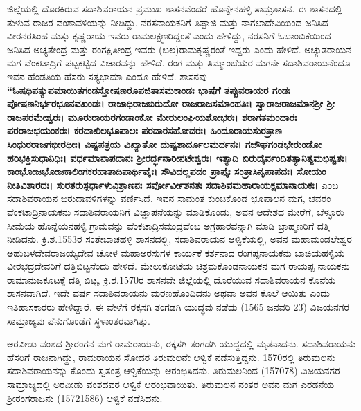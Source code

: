 ಜಿಲ್ಲೆಯಲ್ಲಿ ದೊರಕಿರುವ ಸದಾಶಿವರಾಯನ ಪ್ರಮುಖ ಶಾಸನವೆಂದರೆ ಹೊನ್ನೇನಹಳ್ಳಿ ತಾಮ್ರಶಾಸನ. ಈ ಶಾಸನದಲ್ಲಿ ತುಳುವ ರಾಜರ ವಂಶಾವಳಿಯನ್ನು ನೀಡಿದ್ದು, ನರಸನಾಯಕನಿಗೆ ತಿಪ್ಪಾಜಿ ಮತ್ತು ನಾಗಲಾದೇವಿಯಿಂದ ಜನಿಸಿದ ವೀರನರಸಿಂಹ ಮತ್ತು ಕೃಷ್ಣರಾಯ ಇವರು ರಾಮಲಕ್ಷ್ಮಣರಿದ್ದಂತೆ ಎಂದು ಹೇಳಿದ್ದು, ನರಸನಿಗೆ ಓಬಾಂಬಿಕೆಯಿಂದ ಜನಿಸಿದ ಅಚ್ಯತೇಂದ್ರ ಮತ್ತು ರಂಗಕ್ಷಿತೀಂದ್ರ ಇವರು (ಬಲ)ರಾಮಕೃಷ್ಣರಂತೆ ಇದ್ದರು ಎಂದು ಹೇಳಿದೆ. ಅಚ್ಯುತರಾಯನ ಮಗ ವೆಂಕಟಾದ್ರಿಗೆ ಪಟ್ಟಕಟ್ಟಿದ ವಿಚಾರವನ್ನು ಹೇಳಿದೆ. ರಂಗ ಮತ್ತು ತಿಮ್ಮಾಂಬೆಯರ ಮಗನೇ ಸದಾಶಿವರಾಯನೆಂದೂ ಇವನ ಹೆಂಡತಿಯ ಹೆಸರು ಸತ್ಯಭಾಮಾ ಎಂದೂ ಹೇಳಿದೆ. ಶಾಸನವು \textbf{“ಓಷಧಿಪತ್ಯುಪಮಾಯಿತಗಂಡಸ್ತೋಷಣರೂಪಜಿತಾಸಮಕಾಂಡಃ ಭಾಷೆಗೆ ತಪ್ಪುವರಾಯರ ಗಂಡಃ ಪೋಷಣನಿರ್ಭರಭೂನವಖಂಡಃ। ರಾಜಾಧಿರಾಜಬಿರುದೋ ರಾಜರಾಜಸಮಾಂಹತಿಃ। ಸ್ವಾರಾಜರಾಜಮಾನಶ‍್ರೀ ಶ‍್ರೀ ರಾಜಪರಮೇಶ್ವರಃ। ಮೂರುರಾಯರಗಂಡಾಂಕೋ ಮೇರುಲಂಘಿಯಶೋಭರಃ। ಶರಾಗತಮಂದಾರಃ ಪರರಾಜಭಯಂಕರಃ। ಕರದಾಖಿಲಭೂಪಾಲಃ ಪರದಾರಸಹೋದರಃ। ಹಿಂದೂರಾಯಸುರತ್ರಾಣ ಸಿಂಧುರರಾಜಗಭೀರಧೀಃ। ವಿಷ್ಟಪತ್ರಯ ವಿಖ್ಯಾತೋ ದುಷ್ಟಶಾರ್ದೂಲಮರ್ದನಃ। ಗಜೌಘಗಂಡಭೇರುಂಡೋ ಹರಿಭಕ್ತಿಸುಧಾನಿಧಿಃ। ವರ್ಧಮಾನಾಪದಾನಃ ಶ‍್ರೀರರ್ದ್ಧನಾರೀನಟೇಶ್ವರಃ। ಇತ್ಯಾದಿ ಬಿರುದೈರ್ವಂದಿತತ್ಯಾನಿತ್ಯಮಭಿಷ್ಟತಃ। ಕಾಂಭೋಜಭೋಜಕಾಲಿಂಗಕರಹಾತಾದಿಪಾರ್ಥಿವೈಃ। ಸೌವಿದಲ್ಲಪದಂ ಪ್ರಾಪ್ತೈಃ ಸಂತ್ರಾಸಿನೃಪಾಪದಃ। ಸೋಯಂ ನೀತಿವಿಶಾರದಃ। ಸುರತರುಸ್ಪರ್ಧಾಳುವಿಶ್ರಾಣನಃ ಸರ್ವೋರ್ವೀಶನತಃ ಸದಾಶಿವಮಹಾರಾಯಕ್ಷಮಾನಾಯಕಃ।} ಎಂಬ ಸದಾಶಿವರಾಯನ ಬಿರುದಾವಳಿಗಳನ್ನು ವರ್ಣಿಸಿದೆ. ಇವನ ಸಾಮಂತ ಕುಂಚಿಕೊಂಡ ಭೂಪಾಲನ ಮಗ, ಚವರಂ ವೆಂಕಟಾದ್ರಿನಾಯಕನು ಸದಾಶಿವರಾಯನಿಗೆ ವಿಜ್ಞಾಪನೆಯನ್ನು ಮಾಡಿಕೊಂಡು, ಅವನ ಆದೇಶದ ಮೇರೆಗೆ, ಬೆಳ್ಳೂರು ಸೀಮೆಯ ಹೊನ್ನೆಯನಹಳ್ಳಿ ಗ್ರಾಮವನ್ನು ವೆಂಕಟಾದ್ರಿಸಮುದ್ರವೆಂಬ ಅಗ್ರಹಾರವನ್ನಾಗಿ ಮಾಡಿ ಬ್ರಾಹ್ಮಣರಿಗೆ ದತ್ತಿ ನೀಡಿದನು. ಕ್ರಿ.ಶ.1553ರ ಸಂತೇಬಾಚಹಳ್ಳಿ ಶಾಸನದಲ್ಲಿ, ಸದಾಶಿವರಾಯನ ಆಳ್ವಿಕೆಯಲ್ಲಿ, ಅವನ ಮಹಾಮಂಡಲೇಶ್ವರ ಅಹುಬಳದೇವರಾಜಯ್ಯದೇವ ಚೋಳ ಮಹಾಅರಸುಗಳ ಕಾರ್ಯಕೆ ಕರ್ತನಾದ ರಂಗಪ್ಪನಾಯಕನು ಬಾಚಿಯಹಳ್ಳಿಯ ವೀರಭದ್ರದೇವರಿಗೆ ದತ್ತಿಬಿಟ್ಟನೆಂದು ಹೇಳಿದೆ. ಮೇಲುಕೋಟೆಯ ಚಿತ್ರಮಕೊಂಡನಾಯಕನ ಮಗ ರಾಯಪ್ಪ ನಾಯಕನು ರಾಮಾನುಜಕೂಟಕ್ಕೆ ದತ್ತಿ ಬಿಟ್ಟ, ಕ್ರಿ.ಶ.1570ರ ಶಾಸನವೇ ಜಿಲ್ಲೆಯಲ್ಲಿ ದೊರೆಯುವ ಸದಾಶಿವರಾಯನ ಕೊನೆಯ ಶಾಸನವಾಗಿದೆ. ಇದೇ ವರ್ಷ ಸದಾಶಿವರಾಯನು ಮರಣಹೊಂದಿದನು ಅಥವಾ ಅವನ ಕೊಲೆ ಆಯಿತು ಎಂದು ಇತಿಹಾಸಕಾರರು ಹೇಳಿದ್ದಾರೆ. ಈ ವೇಳೆಗೆ ರಕ್ಕಸಗಿ ತಂಗಡಗಿ ಯುದ್ಧವು ನಡೆದು (1565 ಜನವರಿ 23) ವಿಜಯನಗರ ಸಾಮ್ರಾಜ್ಯವು ಪೆನುಗೊಂಡೆಗೆ ಸ್ಥಳಾಂತರವಾಗಿತ್ತು.

ಅರವೀಡು ವಂಶದ ಶ‍್ರೀರಂಗನ ಮಗ ರಾಮರಾಯನು, ರಕ್ಕಸಗಿ ತಂಗಡಗಿ ಯುದ್ಧದಲ್ಲಿ ಮೃತನಾದನು. ಸದಾಶಿವರಾಯನು ಹೆಸರಿಗೆ ರಾಜನಾಗಿದ್ದು, ರಾಮರಾಯನ ಸೋದರ ತಿರುಮಲನೇ ಆಳ್ವಿಕೆ ನಡೆಸುತ್ತಿದ್ದನು. 1570ರಲ್ಲಿ ತಿರುಮಲನು ಸದಾಶಿವರಾಯನನ್ನು ಕೊಂದು ಸ್ವತಂತ್ರ ಆಳ್ವಿಕೆಯನ್ನು ಆರಂಭಿಸಿದನು. ತಿರುಮಲನಿಂದ (1570\enginline{-}78) ವಿಜಯನಗರ ಸಾಮ್ರಾಜ್ಯದಲ್ಲಿ ಅರವೀಡು ವಂಶದವರ ಆಳ್ವಿಕೆ ಆರಂಭವಾಯಿತು. ತಿರುಮಲನ ನಂತರ ಅವನ ಮಗ ಎರಡನೆಯ ಶ‍್ರೀರಂಗರಾಜನು (1572\enginline{-}1586) ಆಳ್ವಿಕೆ ನಡೆಸಿದನು.

